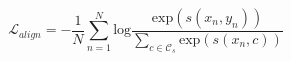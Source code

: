 \begin{equation}
\label{eq:alignment-loss}
{\mathcal{L}}_{align}=-\frac{1}{N}\sum _{n=1}^{N}\mathrm{log}\frac{\mathrm{exp}\left( s\left( {x}_{n},{y}_{n}\right) \right) }{\sum _{c\in {\mathcal{C}}_{s}}\mathrm{exp}\left( s\left( {x}_{n},c\right) \right) }
\end{equation}
